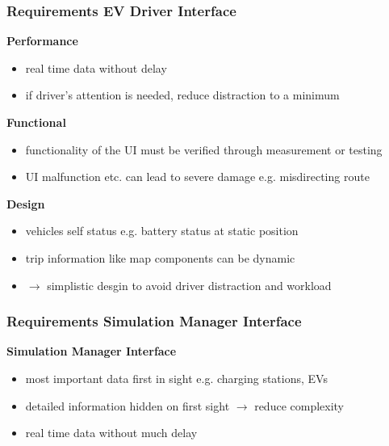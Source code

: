 \begin{frame}
	\frametitle{Requirements EV Driver Interface}

	\begin{PraesentationAufzaehlung}

		\item \textbf{Performance}
		\begin{itemize}
			\item real time data without delay
			\item if driver's attention is needed, reduce distraction to a minimum
		\end{itemize}

		\item \textbf{Functional}
		\begin{itemize}
			\item functionality of the UI must be verified through measurement or testing
			\item UI malfunction etc. can lead to severe damage e.g. misdirecting route
		\end{itemize}

		\item \textbf{Design}
		\begin{itemize}
			\item vehicles self status e.g. battery status at static position
			\item trip information like map components can be dynamic
			\item $\rightarrow$ simplistic desgin to avoid driver distraction and workload
		\end{itemize}

	\end{PraesentationAufzaehlung}
\end{frame}
\clearpage



\begin{frame}
	\frametitle{Requirements Simulation Manager Interface}

	\begin{PraesentationAufzaehlung}

		\item \textbf{Simulation Manager Interface}
		\begin{itemize}
			\item most important data first in sight e.g. charging stations, EVs
			\item detailed information hidden on first sight $\rightarrow$ reduce complexity
			\item real time data without much delay
		\end{itemize}

	\end{PraesentationAufzaehlung}

\end{frame}
\clearpage



